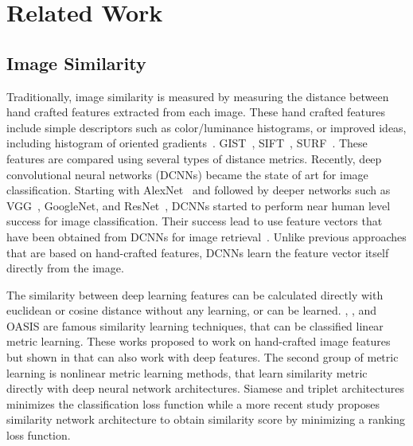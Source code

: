 \chapter{Related Work}
\label{chp:b2}

\section{Image Similarity}

Traditionally, image similarity is measured by measuring the distance between hand crafted features extracted from each image. These hand crafted features include simple descriptors such as color/luminance histograms, or improved ideas, including histogram of oriented gradients~\cite{dalal2005histograms}. GIST~\cite{oliva2001modeling}, SIFT~\cite{lowe2004distinctive}, SURF~\cite{bay2006surf}. These features are compared using several types of distance metrics. Recently, deep convolutional neural networks (DCNNs) became the state of art for image classification. Starting with AlexNet~\cite{krizhevsky2012imagenet} and followed by deeper networks such as VGG~\cite{simonyan2014very}, GoogleNet\cite{szegedy2015going}, and ResNet~\cite{he2016deep}, DCNNs started to perform near human level success for image classification. Their success lead to use feature vectors that have been obtained from DCNNs for image retrieval~\cite{wan2014deep,gordo2016deep,noh2017large,radenovic2018fine}. Unlike previous approaches that are based on hand-crafted features, DCNNs learn the feature vector itself directly from the image. 

The similarity between deep learning features can be calculated directly with euclidean or cosine distance without any learning, or can be learned. \cite{frome2007image}, \cite{mcfee2010metric}, \cite{liang2016optimizing} and  OASIS\cite{chechik2010large} are famous similarity learning techniques, that can be classified linear metric learning. These works proposed to work on hand-crafted image features but shown in \cite{wan2014deep} that can also work with deep features. The second group of metric learning is nonlinear metric learning methods, that learn similarity metric directly with deep neural network architectures\cite{pinheiro2018unsupervised}. Siamese\cite{chopra2005learning}\cite{bell2015learning} and triplet\cite{wang2014learning} \cite{arandjelovic2016netvlad} architectures minimizes the classification loss function while a more recent study \cite{garcia2019learning} proposes similarity network architecture to obtain similarity score by minimizing a ranking loss function.


